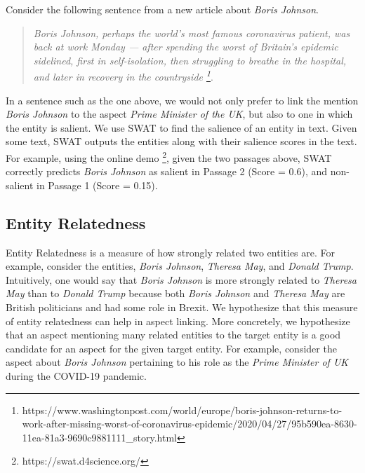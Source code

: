 Consider the following sentence from a new article about \textit{Boris Johnson}.

\begin{quote}
    \textit{Boris Johnson, perhaps the world's most famous coronavirus patient, was back at work Monday — after spending the worst of Britain's epidemic sidelined,
first in self-isolation, then struggling to breathe in the hospital, and later in recovery in the countryside \footnote{https://www.washingtonpost.com/world/europe/boris-johnson-returns-to-work-after-missing-worst-of-coronavirus-epidemic/2020/04/27/95b590ea-8630-11ea-81a3-9690c9881111_story.html}}.
\end{quote}

In a sentence such as the one above, we would not only prefer to link the mention \textit{Boris Johnson} to the aspect \textit{Prime Minister of the UK}, but also to one in which the entity is salient. We use SWAT \cite{swat}  to find the salience of an entity in text. Given some text, SWAT outputs the entities along with their salience scores in the text. For example, using the online demo \footnote{https://swat.d4science.org/}, given the two passages above, SWAT correctly predicts \textit{Boris Johnson} as salient in Passage 2 (Score = 0.6), and non-salient in Passage 1 (Score = 0.15). 

\subsection{Entity Relatedness}
\label{subsec:Entity Relatedness}
Entity Relatedness is a measure of how strongly related two entities are. For example, consider the entities, \textit{Boris Johnson}, \textit{Theresa May}, and \textit{Donald Trump}. Intuitively, one would say that \textit{Boris Johnson} is more strongly related to \textit{Theresa May} than to \textit{Donald Trump} because both \textit{Boris Johnson} and \textit{Theresa May} are British politicians and had some role in Brexit. We hypothesize that this measure of entity relatedness can help in aspect linking. More concretely, we hypothesize that an aspect mentioning many related entities to the target entity  is a good candidate for an aspect for the given target entity. For example, consider the aspect about \textit{Boris Johnson} pertaining to his role as the \textit{Prime Minister of UK} during the COVID-19 pandemic.

